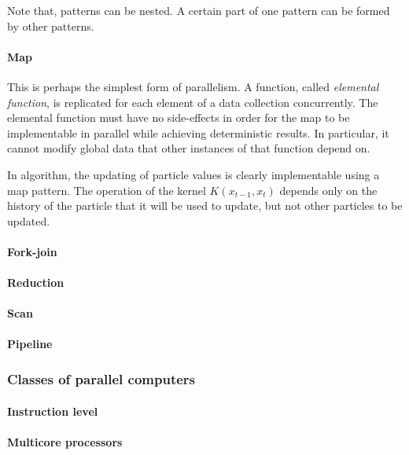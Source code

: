 Note that, patterns can be nested. A certain part of one pattern can be formed
by other patterns.

\paragraph{Map}

This is perhaps the simplest form of parallelism. A function, called
\emph{elemental function}, is replicated for each element of a data collection
concurrently. The elemental function must have no side-effects in order for
the map to be implementable in parallel while achieving deterministic results.
In particular, it cannot modify global data that other instances of that
function depend on.

In \smc algorithm, the updating of particle values is clearly implementable
using a map pattern. The operation of the kernel $K(x_{t-1},x_t)$ depends only
on the history of the particle that it will be used to update, but not other
particles to be updated.

\paragraph{Fork-join}

\paragraph{Reduction}

\paragraph{Scan}

\paragraph{Pipeline}

\subsubsection{Classes of parallel computers}
\label{ssub:Classes of parallel computers}

\paragraph{Instruction level}

\paragraph{Multicore processors}

